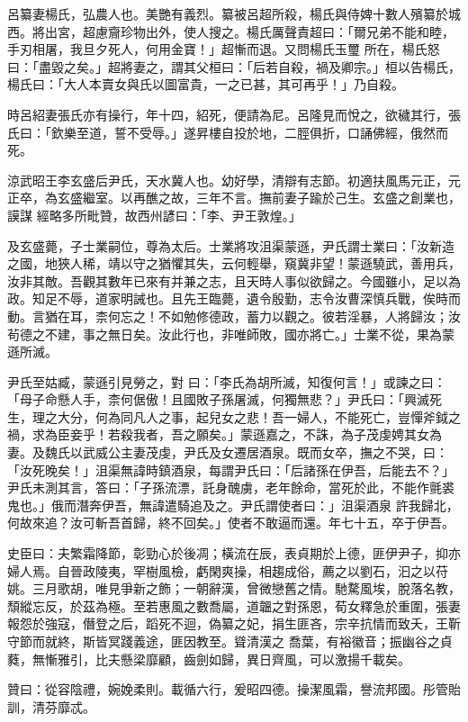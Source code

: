 \begin{pinyinscope}
 呂纂妻楊氏，弘農人也。美艷有義烈。纂被呂超所殺，楊氏與侍婢十數人殯纂於城西。將出宮，超慮齎珍物出外，使人搜之。楊氏厲聲責超曰：「爾兄弟不能和睦，手刃相屠，我旦夕死人，何用金寶！」超慚而退。又問楊氏玉璽
 所在，楊氏怒曰：「盡毀之矣。」超將妻之，謂其父桓曰：「后若自殺，禍及卿宗。」桓以告楊氏，楊氏曰：「大人本賣女與氏以圖富貴，一之已甚，其可再乎！」乃自殺。



 時呂紹妻張氏亦有操行，年十四，紹死，便請為尼。呂隆見而悅之，欲穢其行，張氏曰：「欽樂至道，誓不受辱。」遂昇樓自投於地，二脛俱折，口誦佛經，俄然而死。



 涼武昭王李玄盛后尹氏，天水冀人也。幼好學，清辯有志節。初適扶風馬元正，元正卒，為玄盛繼室。以再醮之故，三年不言。撫前妻子踰於己生。玄盛之創業也，謨謀
 經略多所毗贊，故西州諺曰：「李、尹王敦煌。」



 及玄盛薨，子士業嗣位，尊為太后。士業將攻沮渠蒙遜，尹氏謂士業曰：「汝新造之國，地狹人稀，靖以守之猶懼其失，云何輕舉，窺冀非望！蒙遜驍武，善用兵，汝非其敵。吾觀其數年已來有并兼之志，且天時人事似欲歸之。今國雖小，足以為政。知足不辱，道家明誡也。且先王臨薨，遺令殷勤，志令汝曹深慎兵戰，俟時而動。言猶在耳，柰何忘之！不如勉修德政，蓄力以觀之。彼若淫暴，人將歸汝；汝茍德之不建，事之無日矣。汝此行也，非唯師敗，國亦將亡。」士業不從，果為蒙遜所滅。



 尹氏至姑臧，蒙遜引見勞之，對
 曰：「李氏為胡所滅，知復何言！」或諫之曰：「母子命懸人手，柰何倨傲！且國敗子孫屠滅，何獨無悲？」尹氏曰：「興滅死生，理之大分，何為同凡人之事，起兒女之悲！吾一婦人，不能死亡，豈憚斧鉞之禍，求為臣妾乎！若殺我者，吾之願矣。」蒙遜嘉之，不誅，為子茂虔娉其女為妻。及魏氏以武威公主妻茂虔，尹氏及女遷居酒泉。既而女卒，撫之不哭，曰：「汝死晚矣！」沮渠無諱時鎮酒泉，每謂尹氏曰：「后諸孫在伊吾，后能去不？」尹氏未測其言，答曰：「子孫流漂，託身醜虜，老年餘命，當死於此，不能作氈裘鬼也。」俄而潛奔伊吾，無諱遣騎追及之。尹氏謂使者曰：」沮渠酒泉
 許我歸北，何故來追？汝可斬吾首歸，終不回矣。」使者不敢逼而還。年七十五，卒于伊吾。



 史臣曰：夫繁霜降節，彰勁心於後凋；橫流在辰，表貞期於上德，匪伊尹子，抑亦婦人焉。自晉政陵夷，罕樹風檢，虧閑爽操，相趨成俗，薦之以劉石，汩之以苻姚。三月歌胡，唯見爭新之飾；一朝辭漢，曾微戀舊之情。馳騖風埃，脫落名教，頹縱忘反，於茲為極。至若惠風之數喬屬，道韞之對孫恩，荀女釋急於重圍，張妻報怨於強寇，僭登之后，蹈死不迴，偽纂之妃，捐生匪吝，宗辛抗情而致夭，王靳守節而就終，斯皆冥踐義途，匪因教至。聳清漢之
 喬葉，有裕徽音；振幽谷之貞蕤，無慚雅引，比夫懸梁靡顧，齒劍如歸，異日齊風，可以激揚千載矣。



 贊曰：從容陰禮，婉娩柔則。載循六行，爰昭四德。操潔風霜，譽流邦國。彤管貽訓，清芬靡忒。



\end{pinyinscope}